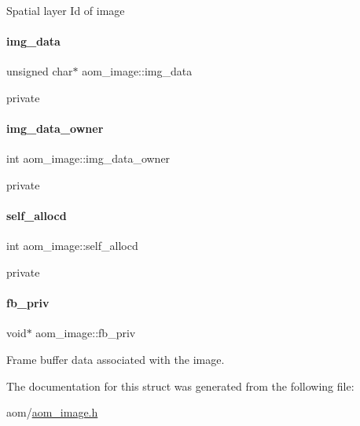 Spatial layer Id of image \mbox{\label{structaom__image_a7c367f3227d5876ce9e5c198a01c2028}} 
\paragraph{\texorpdfstring{img\+\_\+data}{img\_data}}
{\footnotesize\ttfamily unsigned char$\ast$ aom\+\_\+image\+::img\+\_\+data}

private \mbox{\label{structaom__image_ad29ed1ce3206c77ade67a76b69ee339e}} 
\paragraph{\texorpdfstring{img\+\_\+data\+\_\+owner}{img\_data\_owner}}
{\footnotesize\ttfamily int aom\+\_\+image\+::img\+\_\+data\+\_\+owner}

private \mbox{\label{structaom__image_adcb959372df75813c6b1e01903ec3011}} 
\paragraph{\texorpdfstring{self\+\_\+allocd}{self\_allocd}}
{\footnotesize\ttfamily int aom\+\_\+image\+::self\+\_\+allocd}

private \mbox{\label{structaom__image_aab189cb8d141a7b46102a913327398b3}} 
\paragraph{\texorpdfstring{fb\+\_\+priv}{fb\_priv}}
{\footnotesize\ttfamily void$\ast$ aom\+\_\+image\+::fb\+\_\+priv}

Frame buffer data associated with the image. 

The documentation for this struct was generated from the following file\+:\begin{DoxyCompactItemize}
\item 
aom/\hyperlink{aom__image_8h}{aom\+\_\+image.\+h}\end{DoxyCompactItemize}
